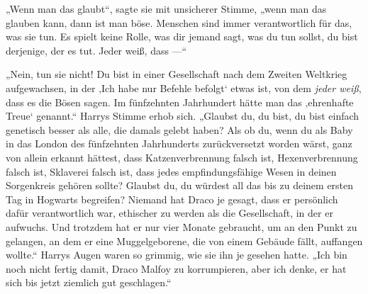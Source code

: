„Wenn man das glaubt“, sagte sie mit unsicherer Stimme, „wenn man das glauben kann, dann ist man böse. Menschen sind immer verantwortlich für das, was sie tun. Es spielt keine Rolle, was dir jemand sagt, was du tun sollst, du bist derjenige, der es tut. Jeder weiß, dass —“

„Nein, tun sie nicht! Du bist in einer Gesellschaft nach dem Zweiten Weltkrieg aufgewachsen, in der ‚Ich habe nur Befehle befolgt‘ etwas ist, von dem \emph{jeder weiß}, dass es die Bösen sagen. Im fünfzehnten Jahrhundert hätte man das ‚ehrenhafte Treue‘ genannt.“
Harrys Stimme erhob sich.
„Glaubst du, du bist, du bist einfach genetisch besser als alle, die damals gelebt haben? Als ob du, wenn du als Baby in das London des fünfzehnten Jahrhunderts zurückversetzt worden wärst, ganz von allein erkannt hättest, dass Katzenverbrennung falsch ist, Hexenverbrennung falsch ist, Sklaverei falsch ist, dass jedes empfindungsfähige Wesen in deinen Sorgenkreis gehören sollte? Glaubst du, du würdest all das bis zu deinem ersten Tag in Hogwarts begreifen? Niemand hat Draco je gesagt, dass er persönlich dafür verantwortlich war, ethischer zu werden als die Gesellschaft, in der er aufwuchs. Und trotzdem hat er nur vier Monate gebraucht, um an den Punkt zu gelangen, an dem er eine Muggelgeborene, die von einem Gebäude fällt, auffangen wollte.“
Harrys Augen waren so grimmig, wie sie ihn je gesehen hatte.
„Ich bin noch nicht fertig damit, Draco Malfoy zu korrumpieren, aber ich denke, er hat sich bis jetzt ziemlich gut geschlagen.“

